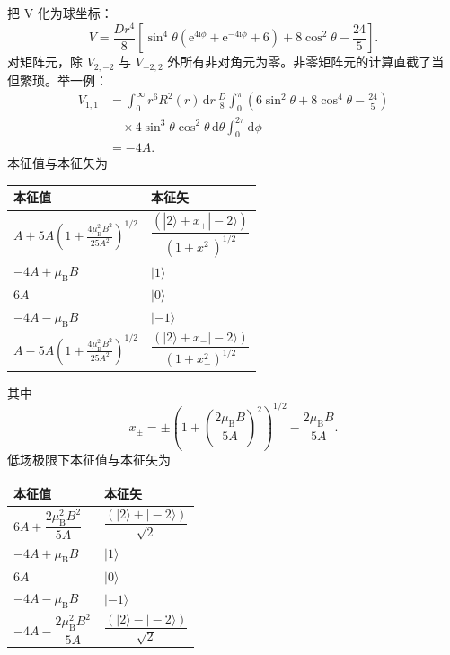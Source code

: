  把 V 化为球坐标：
\begin{equation*}
V = \frac{Dr^{4}}{8}\left[\sin^{4}\theta\left(\mathrm{e}^{4\mathrm{i}\phi}+\mathrm{e}^{-4\mathrm{i}\phi}+6\right) + 8\cos^{2}\theta - \frac{24}{5}\right].\tag{F.21}
\end{equation*}
对矩阵元，除 $V_{2,-2}$ 与 $V_{-2,2}$ 外所有非对角元为零。非零矩阵元的计算直截了当
但繁琐。举一例：
\begin{align*}
V_{1,1} &= \int_{0}^{\infty}r^{6}R^{2}(r)\,\mathrm{d}r\,\frac{D}{8}\int_{0}^{\pi}\left(6\sin^{2}\theta+8\cos^{4}\theta-\frac{24}{5}\right)\\
&\quad\times4\sin^{3}\theta\cos^{2}\theta\,\mathrm{d}\theta\int_{0}^{2\pi}\mathrm{d}\phi\\
&= -4A.\tag{F.22}
\end{align*}
本征值与本征矢为
\begin{center}
\begin{tabular}{ll}
本征值 & 本征矢\\
\midrule
$A+5A\left(1+\frac{4\mu_{\mathrm{B}}^{2}B^{2}}{25A^{2}}\right)^{1/2}$ & $\dfrac{(|2\rangle+x_{+}|-2\rangle)}{(1+x_{+}^{2})^{1/2}}$\\[10pt]
$-4A+\mu_{\mathrm{B}}B$ & $|1\rangle$\\
$6A$ & $|0\rangle$\\
$-4A-\mu_{\mathrm{B}}B$ & $|-1\rangle$\\
$A-5A\left(1+\frac{4\mu_{\mathrm{B}}^{2}B^{2}}{25A^{2}}\right)^{1/2}$ & $\dfrac{(|2\rangle+x_{-}|-2\rangle)}{(1+x_{-}^{2})^{1/2}}$\\
\end{tabular}
\end{center}
其中
\begin{equation*}
x_{\pm} = \pm\left(1+\left(\frac{2\mu_{\mathrm{B}}B}{5A}\right)^{2}\right)^{1/2} - \frac{2\mu_{\mathrm{B}}B}{5A}.\tag{F.23}
\end{equation*}
低场极限下本征值与本征矢为
\begin{center}
\begin{tabular}{ll}
本征值 & 本征矢\\
\midrule
$6A+\dfrac{2\mu_{\mathrm{B}}^{2}B^{2}}{5A}$ & $\dfrac{(|2\rangle+|-2\rangle)}{\sqrt{2}}$\\[10pt]
$-4A+\mu_{\mathrm{B}}B$ & $|1\rangle$\\
$6A$ & $|0\rangle$\\
$-4A-\mu_{\mathrm{B}}B$ & $|-1\rangle$\\
$-4A-\dfrac{2\mu_{\mathrm{B}}^{2}B^{2}}{5A}$ & $\dfrac{(|2\rangle-|-2\rangle)}{\sqrt{2}}$\\
\end{tabular}
\end{center}
